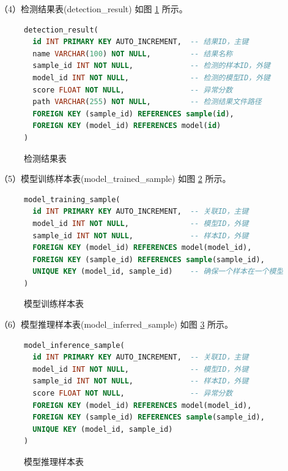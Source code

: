 \documentclass[
  ]{njuthesis}
\begin{document}
（4）检测结果表(detection\_result) 如图 \ref{检测结果表} 所示。

\begin{figure}[H]
    \centering
    \begin{minipage}{0.88\textwidth}
    {\linespread{1.2}
    \begin{lstlisting}[language=sql]
detection_result(
  id INT PRIMARY KEY AUTO_INCREMENT,  -- 结果ID，主键
  name VARCHAR(100) NOT NULL,         -- 结果名称
  sample_id INT NOT NULL,             -- 检测的样本ID，外键
  model_id INT NOT NULL,              -- 检测的模型ID，外键
  score FLOAT NOT NULL,               -- 异常分数
  path VARCHAR(255) NOT NULL,         -- 检测结果文件路径
  FOREIGN KEY (sample_id) REFERENCES sample(id),
  FOREIGN KEY (model_id) REFERENCES model(id)
)
    \end{lstlisting}}
    \end{minipage}
    \caption{检测结果表}
    \label{检测结果表}
\end{figure}

（5）模型训练样本表(model\_trained\_sample) 如图 \ref{模型训练样本表} 所示。

\begin{figure}[H]
    \centering
    \begin{minipage}{0.88\textwidth}
    {\linespread{1.2}
    \begin{lstlisting}[language=sql]
model_training_sample(
  id INT PRIMARY KEY AUTO_INCREMENT,  -- 关联ID，主键
  model_id INT NOT NULL,              -- 模型ID，外键
  sample_id INT NOT NULL,             -- 样本ID，外键
  FOREIGN KEY (model_id) REFERENCES model(model_id),
  FOREIGN KEY (sample_id) REFERENCES sample(sample_id),
  UNIQUE KEY (model_id, sample_id)    -- 确保一个样本在一个模型中只被训练一次
)
    \end{lstlisting}}
    \end{minipage}
    \caption{模型训练样本表}
    \label{模型训练样本表}
\end{figure}

（6）模型推理样本表(model\_inferred\_sample) 如图 \ref{模型推理样本表} 所示。

\begin{figure}[H]
    \centering
    \begin{minipage}{0.88\textwidth}
    {\linespread{1.2}
    \begin{lstlisting}[language=sql]
model_inference_sample(
  id INT PRIMARY KEY AUTO_INCREMENT,  -- 关联ID，主键
  model_id INT NOT NULL,              -- 模型ID，外键
  sample_id INT NOT NULL,             -- 样本ID，外键
  score FLOAT NOT NULL,               -- 异常分数
  FOREIGN KEY (model_id) REFERENCES model(model_id),
  FOREIGN KEY (sample_id) REFERENCES sample(sample_id),
  UNIQUE KEY (model_id, sample_id)
)
    \end{lstlisting}}
    \end{minipage}
    \caption{模型推理样本表}
    \label{模型推理样本表}
\end{figure}
\end{document}
